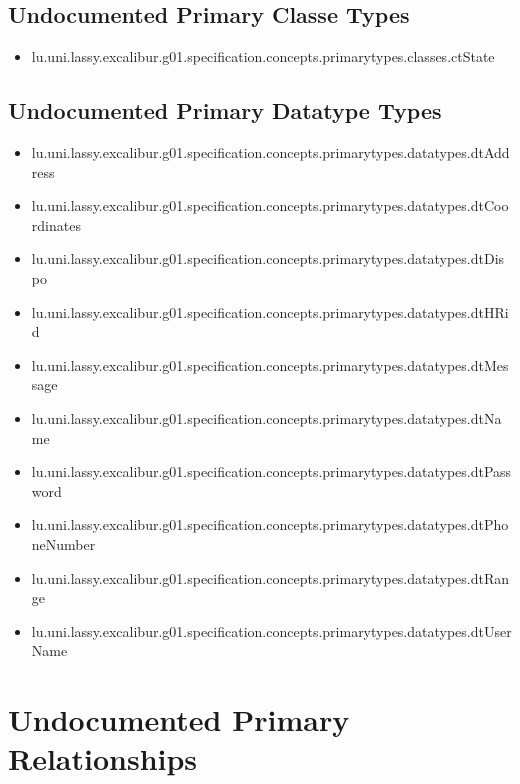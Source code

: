 \subsection[Undocumented Primary Classe Types]{Undocumented Primary Classe Types}
\begin{itemize}
\item lu.uni.lassy.excalibur.g01.specification.concepts.primarytypes.classes.ctState 
\end{itemize}

\subsection[Undocumented Primary Datatype Types]{Undocumented Primary Datatype Types}
\begin{itemize}
\item lu.uni.lassy.excalibur.g01.specification.concepts.primarytypes.datatypes.dtAddress 
\item lu.uni.lassy.excalibur.g01.specification.concepts.primarytypes.datatypes.dtCoordinates 
\item lu.uni.lassy.excalibur.g01.specification.concepts.primarytypes.datatypes.dtDispo 
\item lu.uni.lassy.excalibur.g01.specification.concepts.primarytypes.datatypes.dtHRid 
\item lu.uni.lassy.excalibur.g01.specification.concepts.primarytypes.datatypes.dtMessage 
\item lu.uni.lassy.excalibur.g01.specification.concepts.primarytypes.datatypes.dtName 
\item lu.uni.lassy.excalibur.g01.specification.concepts.primarytypes.datatypes.dtPassword 
\item lu.uni.lassy.excalibur.g01.specification.concepts.primarytypes.datatypes.dtPhoneNumber 
\item lu.uni.lassy.excalibur.g01.specification.concepts.primarytypes.datatypes.dtRange 
\item lu.uni.lassy.excalibur.g01.specification.concepts.primarytypes.datatypes.dtUserName 
\end{itemize}







\section[Undocumented Primary Type Relationships]{Undocumented Primary Relationships}

